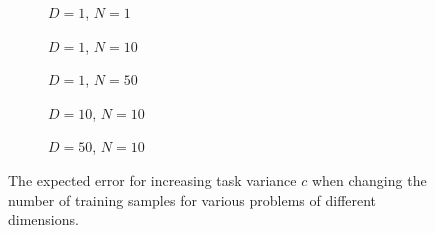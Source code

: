 \begin{figure}[!h]
  \centering
    \begin{subfigure}{0.33\textwidth}
      \centering
      \caption{$D=1$, $N=1$}
      \label{fig:linear-c-N-1-D-1}
    \end{subfigure}
    \begin{subfigure}{0.33\textwidth}
      \centering
      \caption{$D=1$, $N=10$}
      \label{fig:linear-c-N-10-D-1}
    \end{subfigure}
    \begin{subfigure}{0.33\textwidth}
      \centering
      \caption{$D=1$, $N=50$}
      \label{fig:linear-c-N-50-D-1}
    \end{subfigure}

    \begin{subfigure}{0.33\textwidth}
      \centering
      \caption{$D=10$, $N=10$}
      \label{fig:linear-c-N-10-D-10}
    \end{subfigure}
    \begin{subfigure}{0.33\textwidth}
      \centering
      \caption{$D=50$, $N=10$}
      \label{fig:linear-c-N-10-D-50}
    \end{subfigure}  

  \caption{The expected error for increasing task variance $c$ when changing the number of training samples for various problems of different dimensions.}
  \label{fig:linear-c}
\end{figure}

